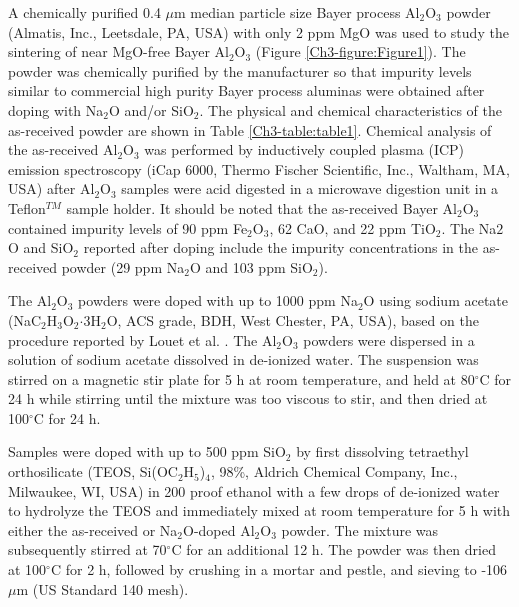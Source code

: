 A chemically purified 0.4 $\mu$m median particle size Bayer process Al$_{2}$O$_{3}$ powder (Almatis, Inc., Leetsdale, PA, USA) with only 2 ppm MgO was used to study the sintering of near MgO-free Bayer Al$_{2}$O$_{3}$ (Figure \ref{Ch3-figure:Figure1}). The powder was chemically purified by the manufacturer so that impurity levels similar to commercial high purity Bayer process aluminas were obtained after doping with Na$_{2}$O and/or SiO$_{2}$. The physical and chemical characteristics of the as-received powder are shown in Table \ref{Ch3-table:table1}. Chemical analysis of the as-received Al$_{2}$O$_{3}$ was performed by inductively coupled plasma (ICP) emission spectroscopy (iCap 6000, Thermo Fischer Scientific, Inc., Waltham, MA, USA) after Al$_{2}$O$_{3}$ samples were acid digested in a microwave digestion unit in a Teflon$^{TM}$ sample holder.  It should be noted that the as-received Bayer Al$_{2}$O$_{3}$ contained impurity levels of 90 ppm Fe$_{2}$O$_{3}$, 62 CaO, and 22 ppm TiO$_{2}$.  The Na${2}$O and SiO$_{2}$ reported after doping include the impurity concentrations in the as-received powder (29 ppm Na$_{2}$O and 103 ppm SiO$_{2}$). 

The Al$_{2}$O$_{3}$ powders were doped with up to 1000 ppm Na$_{2}$O using sodium acetate (NaC$_{2}$H$_{3}$O$_{2}$$\cdot$3H$_{2}$O, ACS grade, BDH, West Chester, PA, USA), based on the procedure reported by Louet et al. \cite{Louet2005}. The Al$_{2}$O$_{3}$ powders were dispersed in a solution of sodium acetate dissolved in de-ionized water. The suspension was stirred on a magnetic stir plate for 5 h at room temperature, and held at 80$^{\circ}$C for 24 h while stirring until the mixture was too viscous to stir, and then dried at 100$^{\circ}$C for 24 h. 

Samples were doped with up to 500 ppm SiO$_{2}$ by first dissolving tetraethyl orthosilicate (TEOS, Si(OC$_{2}$H$_{5}$)$_{4}$, 98\%, Aldrich Chemical Company, Inc., Milwaukee, WI, USA) in 200 proof ethanol with a few drops of de-ionized water to hydrolyze the TEOS and immediately mixed at room temperature for 5 h with either the as-received or Na$_{2}$O-doped Al$_{2}$O$_{3}$ powder. The mixture was subsequently stirred at 70$^{\circ}$C for an additional 12 h. The powder was then dried at 100$^{\circ}$C for 2 h, followed by crushing in a mortar and pestle, and sieving to -106 $\mu$m (US Standard 140 mesh).

